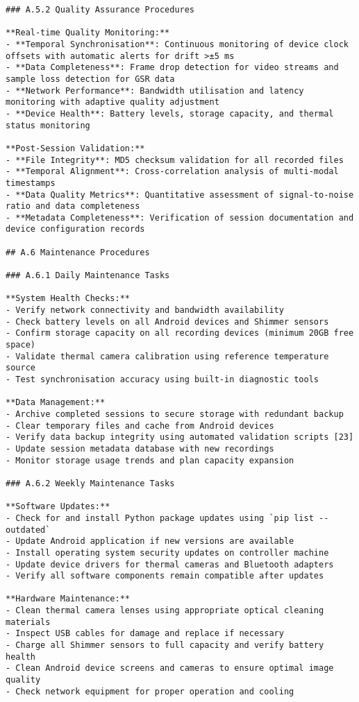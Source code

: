 \begin{verbatim}
### A.5.2 Quality Assurance Procedures

**Real-time Quality Monitoring:**
- **Temporal Synchronisation**: Continuous monitoring of device clock offsets with automatic alerts for drift >±5 ms
- **Data Completeness**: Frame drop detection for video streams and sample loss detection for GSR data
- **Network Performance**: Bandwidth utilisation and latency monitoring with adaptive quality adjustment
- **Device Health**: Battery levels, storage capacity, and thermal status monitoring

**Post-Session Validation:**
- **File Integrity**: MD5 checksum validation for all recorded files
- **Temporal Alignment**: Cross-correlation analysis of multi-modal timestamps
- **Data Quality Metrics**: Quantitative assessment of signal-to-noise ratio and data completeness
- **Metadata Completeness**: Verification of session documentation and device configuration records

## A.6 Maintenance Procedures

### A.6.1 Daily Maintenance Tasks

**System Health Checks:**
- Verify network connectivity and bandwidth availability
- Check battery levels on all Android devices and Shimmer sensors
- Confirm storage capacity on all recording devices (minimum 20GB free space)
- Validate thermal camera calibration using reference temperature source
- Test synchronisation accuracy using built-in diagnostic tools

**Data Management:**
- Archive completed sessions to secure storage with redundant backup
- Clear temporary files and cache from Android devices
- Verify data backup integrity using automated validation scripts [23]
- Update session metadata database with new recordings
- Monitor storage usage trends and plan capacity expansion

### A.6.2 Weekly Maintenance Tasks

**Software Updates:**
- Check for and install Python package updates using `pip list --outdated`
- Update Android application if new versions are available
- Install operating system security updates on controller machine
- Update device drivers for thermal cameras and Bluetooth adapters
- Verify all software components remain compatible after updates

**Hardware Maintenance:**
- Clean thermal camera lenses using appropriate optical cleaning materials
- Inspect USB cables for damage and replace if necessary
- Charge all Shimmer sensors to full capacity and verify battery health
- Clean Android device screens and cameras to ensure optimal image quality
- Check network equipment for proper operation and cooling


\end{verbatim}
